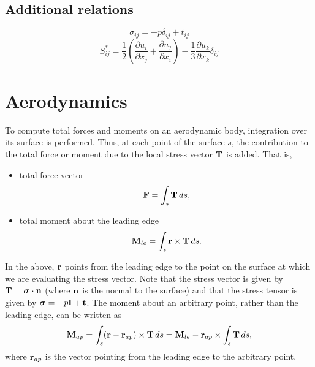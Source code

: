 \documentclass[oneside,a4paper,11pt]{report}
\begin{document}
\section{Additional relations}
\begin{equation}
    \sigma_{ij} = -p \delta_{ij} + t_{ij}
\end{equation}
\begin{equation}
    S^*_{ij} = \frac{1}{2} \left ( \frac{\partial u_i}{\partial x_j} + \frac{\partial u_j}{\partial x_i} \right ) - \frac{1}{3} \frac{\partial u_k}{\partial x_k} \delta_{ij}
\end{equation}

\chapter{Aerodynamics}
To compute total forces and moments on an aerodynamic body, integration over its surface is performed. Thus, at each point of the surface $s$, the contribution to the total force or moment due to the local stress vector $\mathbf{T}$ is added. That is,
\begin{itemize}
    \item total force vector
    \begin{equation}
        \mathbf{F} = \int_s \mathbf{T} \, ds,
    \end{equation}
    \item total moment about the leading edge 
    \begin{equation}
        \mathbf{M}_{le} = \int_s \mathbf{r} \times \mathbf{T} \, ds.
    \end{equation}
\end{itemize}
In the above, $\mathbf{r}$ points from the leading edge to the point on the surface at which we are evaluating the stress vector. Note that the stress vector is given by $\mathbf{T} = \boldsymbol{\sigma} \cdot \mathbf{n}$ (where $\mathbf{n}$ is the normal to the surface) and that the stress tensor is given by $\boldsymbol{\sigma} = -p \mathbf{I} + \mathbf{t}$. The moment about an arbitrary point, rather than the leading edge, can be written as
\begin{equation}
\label{eq:moment_shift}
    \mathbf{M}_{ap} = \int_s (\mathbf{r} - \mathbf{r}_{ap} ) \times \mathbf{T} \, ds = \mathbf{M}_{le} - \mathbf{r}_{ap} \times \int_s  \mathbf{T} \, ds,
\end{equation}
where $\mathbf{r}_{ap}$ is the vector pointing from the leading edge to the arbitrary point. 
\end{document}
